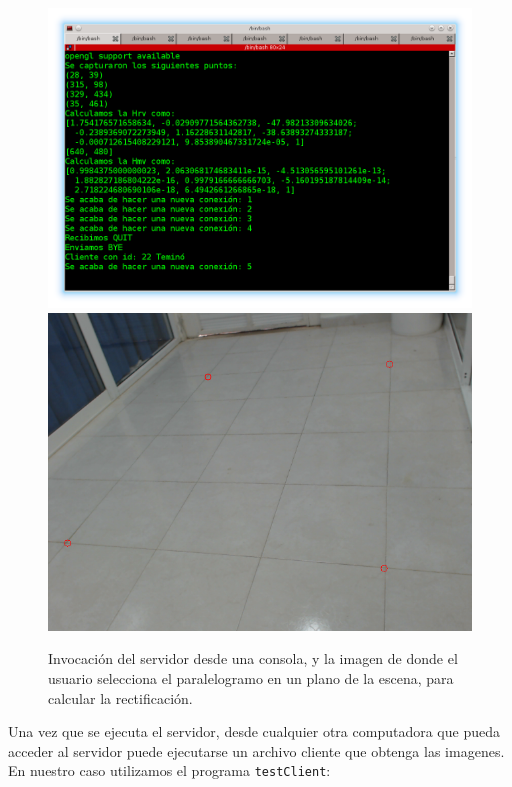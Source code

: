 \documentclass[12pt,letterpaper,notitlepage]{report}
\newlength{\spacing} \setlength{\spacing}{\baselineskip}
\newcommand{\nspace}[1]{\setlength{\baselineskip}{#1\spacing}}
\newenvironment{linespacing}[1]{\nspace{#1}}{}
\begin{document}
{\begin{linespacing}{1.5}
\begin{figure}[htbp!]
  \centering
  \includegraphics[width=\textwidth]{imagenes/imgServerConsole.png}\\
  \includegraphics[width=\textwidth]{imagenes/inImage1A.png}\\
  \caption{Invocación del servidor desde una consola, y la imagen de donde el usuario selecciona el paralelogramo en un plano de la escena, para calcular la rectificación.}
  \label{fig:imgConsola}
\end{figure}

Una vez que se ejecuta el servidor, desde cualquier otra computadora que pueda acceder al servidor puede ejecutarse un archivo cliente que obtenga las imagenes. En nuestro caso utilizamos el programa \verb|testClient|:


\end{linespacing}}
\end{document}
